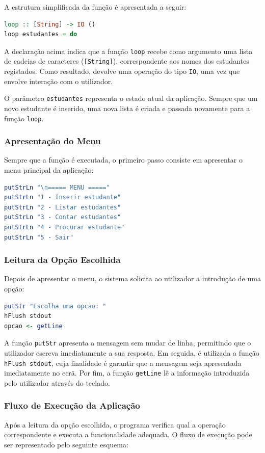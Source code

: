\documentclass[12pt,a4paper]{article}
\begin{document}
A estrutura simplificada da função é apresentada a seguir:
\begin{lstlisting}[language=Haskell]
loop :: [String] -> IO ()
loop estudantes = do
\end{lstlisting}

A declaração acima indica que a função \texttt{loop} recebe como argumento uma lista de cadeias de caracteres (\texttt{[String]}), correspondente aos nomes dos estudantes registados. Como resultado, devolve uma operação do tipo \texttt{IO}, uma vez que envolve interação com o utilizador.

O parâmetro \texttt{estudantes} representa o estado atual da aplicação. Sempre que um novo estudante é inserido, uma nova lista é criada e passada novamente para a função \texttt{loop}.

\subsubsection*{Apresentação do Menu}
Sempre que a função é executada, o primeiro passo consiste em apresentar o menu principal da aplicação:
\begin{lstlisting}[language=Haskell]
putStrLn "\n===== MENU ====="
putStrLn "1 - Inserir estudante"
putStrLn "2 - Listar estudantes"
putStrLn "3 - Contar estudantes"
putStrLn "4 - Procurar estudante"
putStrLn "5 - Sair"
\end{lstlisting}

\subsubsection*{Leitura da Opção Escolhida}
Depois de apresentar o menu, o sistema solicita ao utilizador a introdução de uma opção:
\begin{lstlisting}[language=Haskell]
putStr "Escolha uma opcao: "
hFlush stdout
opcao <- getLine
\end{lstlisting}
A função \texttt{putStr} apresenta a mensagem sem mudar de linha, permitindo que o utilizador escreva imediatamente a sua resposta. Em seguida, é utilizada a função \texttt{hFlush stdout}, cuja finalidade é garantir que a mensagem seja apresentada imediatamente no ecrã. Por fim, a função \texttt{getLine} lê a informação introduzida pelo utilizador através do teclado.

\subsubsection*{Fluxo de Execução da Aplicação}
Após a leitura da opção escolhida, o programa verifica qual a operação correspondente e executa a funcionalidade adequada. O fluxo de execução pode ser representado pelo seguinte esquema:
\end{document}

